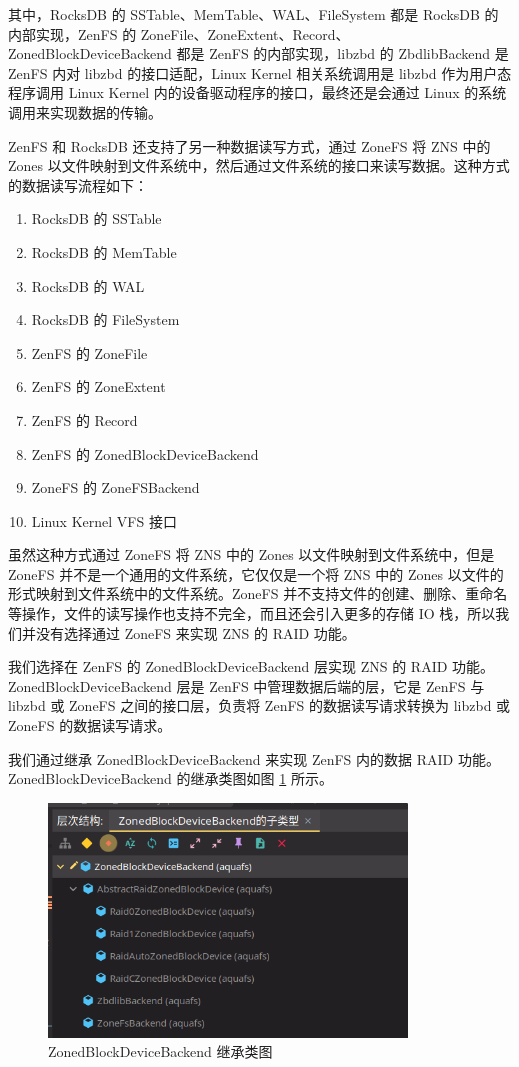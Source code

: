 其中，RocksDB 的 SSTable、MemTable、WAL、FileSystem 都是 RocksDB 的内部实现，ZenFS 的 ZoneFile、ZoneExtent、Record、ZonedBlockDeviceBackend 都是 ZenFS 的内部实现，libzbd 的 ZbdlibBackend 是 ZenFS 内对 libzbd 的接口适配，Linux Kernel 相关系统调用是 libzbd 作为用户态程序调用 Linux Kernel 内的设备驱动程序的接口，最终还是会通过 Linux 的系统调用来实现数据的传输。

ZenFS 和 RocksDB 还支持了另一种数据读写方式，通过 ZoneFS 将 ZNS 中的 Zones 以文件映射到文件系统中，然后通过文件系统的接口来读写数据。这种方式的数据读写流程如下：

\begin{enumerate}
  \item RocksDB 的 SSTable
  \item RocksDB 的 MemTable
  \item RocksDB 的 WAL
  \item RocksDB 的 FileSystem
  \item ZenFS 的 ZoneFile
  \item ZenFS 的 ZoneExtent
  \item ZenFS 的 Record
  \item ZenFS 的 ZonedBlockDeviceBackend
  \item ZoneFS 的 ZoneFSBackend
  \item Linux Kernel VFS 接口
\end{enumerate}

虽然这种方式通过 ZoneFS 将 ZNS 中的 Zones 以文件映射到文件系统中，但是 ZoneFS 并不是一个通用的文件系统，它仅仅是一个将 ZNS 中的 Zones 以文件的形式映射到文件系统中的文件系统。ZoneFS 并不支持文件的创建、删除、重命名等操作，文件的读写操作也支持不完全，而且还会引入更多的存储 IO 栈，所以我们并没有选择通过 ZoneFS 来实现 ZNS 的 RAID 功能。

我们选择在 ZenFS 的 ZonedBlockDeviceBackend 层实现 ZNS 的 RAID 功能。ZonedBlockDeviceBackend 层是 ZenFS 中管理数据后端的层，它是 ZenFS 与 libzbd 或 ZoneFS 之间的接口层，负责将 ZenFS 的数据读写请求转换为 libzbd 或 ZoneFS 的数据读写请求。

我们通过继承 ZonedBlockDeviceBackend 来实现 ZenFS 内的数据 RAID 功能。ZonedBlockDeviceBackend 的继承类图如图 \ref{raid-layers} 所示。

\begin{figure}[htbp]
  \centering
  \includegraphics[width=0.85\textwidth]{fig/raid-layers}
  \caption{ ZonedBlockDeviceBackend 继承类图 }
  \label{raid-layers}
\end{figure}

